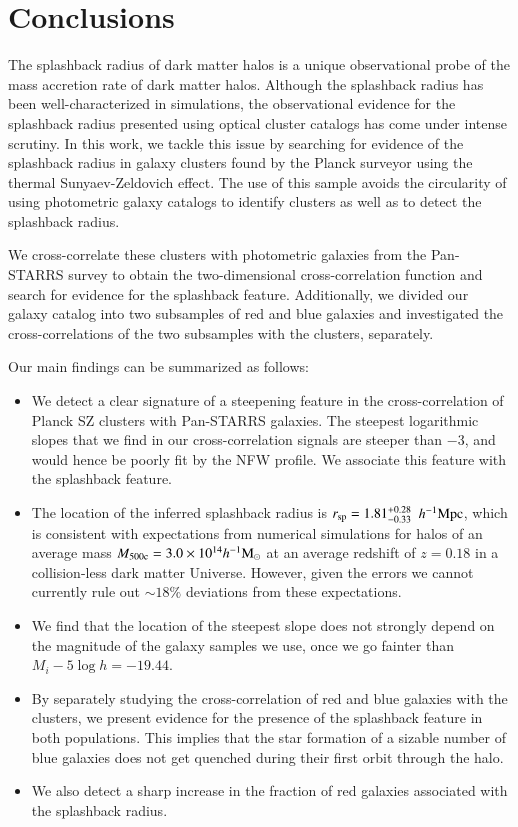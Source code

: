 \documentclass[iop, apjl, twocolappendix, numberedappendix]{emulateapj}
\def\mpch{h^{-1}{\rm Mpc}}
\def\msunh{h^{-1}{\rm M_{\odot}}}
\begin{document}
\section{Conclusions}
\label{sec:Conclusions}
The splashback radius of dark matter halos is a unique observational
probe of the mass accretion rate of dark matter halos. Although the
splashback radius has been well-characterized in simulations, the
observational evidence for the splashback radius presented using
optical cluster catalogs has come under intense scrutiny. In this
work, we tackle this issue by searching for evidence of the
splashback radius in galaxy clusters found by the Planck surveyor using
the thermal Sunyaev-Zeldovich effect. The use of this sample avoids
the circularity of using photometric galaxy catalogs to identify
clusters as well as to detect the splashback radius. 

We cross-correlate these clusters with photometric galaxies from the
Pan-STARRS survey to obtain the two-dimensional cross-correlation
function and search for evidence for the splashback feature.
Additionally, we divided our galaxy catalog into two subsamples of
red and blue galaxies and investigated the cross-correlations of the
two subsamples with the clusters, separately.

Our main findings can be summarized as follows:
\begin{itemize}
\item We detect a clear signature of a steepening feature in the
cross-correlation of Planck SZ clusters with Pan-STARRS
galaxies. The steepest logarithmic slopes that we find in our cross-correlation
signals are steeper than $-3$, and would hence be poorly fit by the
NFW profile. We associate this feature with the splashback feature.
\item The location of the inferred splashback radius is $r_{\rm
sp}=1.81_{-0.33}^{+0.28}$ $\mpch$, which is consistent with expectations
from numerical simulations for
halos of an average mass $M_{\rm 500c}=3.0\times10^{14}\msunh$ at an
average redshift of $z=0.18$ in a collision-less dark matter Universe. 
However, given the errors we cannot
currently rule out $\sim18\%$ deviations from these expectations.
\item We find that the location of the steepest slope does not
strongly depend on the magnitude of the galaxy samples we use, once
we go fainter than $M_i-5\log h=-19.44$.
\item By separately studying the cross-correlation of red and blue
galaxies with the clusters, we present evidence for the presence of
the splashback feature in both populations. This implies that the
star formation of a sizable number of blue galaxies does not get
quenched during their first orbit through the halo.
\item We also detect a sharp increase in the fraction of red
galaxies associated with the splashback radius. 
\end{itemize}
\end{document}
